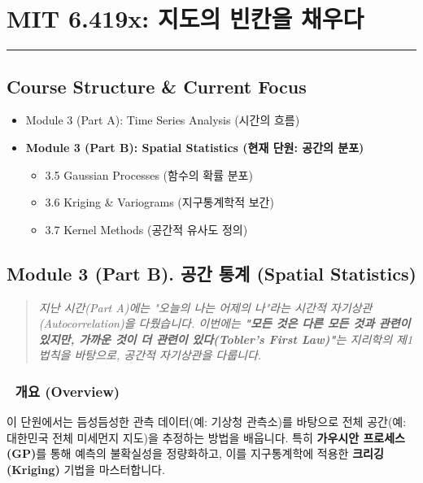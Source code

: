 \documentclass[11pt,a4paper]{book}
\theoremstyle{definition}
\begin{document}
\chapter{MIT 6.419x: 지도의 빈칸을 채우다}
\label{ch:lecture8}


\vspace{1cm}
\hrule
\vspace{1cm}

\section*{Course Structure \& Current Focus}
\begin{itemize}
    \item Module 3 (Part A): Time Series Analysis (시간의 흐름)
    \item \textbf{\textcolor{mainblue}{Module 3 (Part B): Spatial Statistics (현재 단원: 공간의 분포)}}
    \begin{itemize}
        \item 3.5 Gaussian Processes (함수의 확률 분포)
        \item 3.6 Kriging \& Variograms (지구통계학적 보간)
        \item 3.7 Kernel Methods (공간적 유사도 정의)
    \end{itemize}
\end{itemize}


\section{Module 3 (Part B). 공간 통계 (Spatial Statistics)}

\begin{quote}
\textit{지난 시간(Part A)에는 "오늘의 나는 어제의 나"라는 시간적 자기상관(Autocorrelation)을 다뤘습니다. 이번에는 \textbf{"모든 것은 다른 모든 것과 관련이 있지만, 가까운 것이 더 관련이 있다(Tobler's First Law)"}는 지리학의 제1법칙을 바탕으로, 공간적 자기상관을 다룹니다.}
\end{quote}

\subsection*{📌 개요 (Overview)}
이 단원에서는 듬성듬성한 관측 데이터(예: 기상청 관측소)를 바탕으로 전체 공간(예: 대한민국 전체 미세먼지 지도)을 추정하는 방법을 배웁니다. 특히 \textbf{가우시안 프로세스(GP)}를 통해 예측의 불확실성을 정량화하고, 이를 지구통계학에 적용한 \textbf{크리깅(Kriging)} 기법을 마스터합니다.
\end{document}
